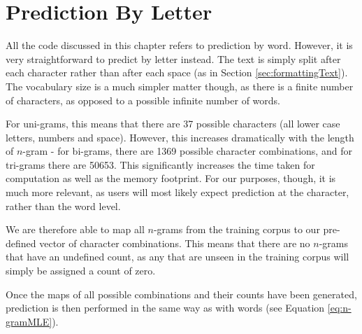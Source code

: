 
\section{Prediction By Letter}

All the code discussed in this chapter refers to prediction by word. However, it is very straightforward to predict by letter instead. The text is simply split after each character rather than after each space (as in Section \ref{sec:formattingText}). The vocabulary size is a much simpler matter though, as there is a finite number of characters, as opposed to a possible infinite number of words.

For uni-grams, this means that there are 37 possible characters (all lower case letters, numbers and space). However, this increases dramatically with the length of $n$-gram - for bi-grams, there are 1369 possible character combinations, and for tri-grams there are 50653. This significantly increases the time taken for computation as well as the memory footprint. For our purposes, though, it is much more relevant, as users will most likely expect prediction at the character, rather than the word level.

We are therefore able to map all $n$-grams from the training corpus to our pre-defined vector of character combinations. This means that there are no $n$-grams that have an undefined count, as any that are unseen in the training corpus will simply be assigned a count of zero.

Once the maps of all possible combinations and their counts have been generated, prediction is then performed in the same way as with words (see Equation \ref{eq:n-gramMLE}).
